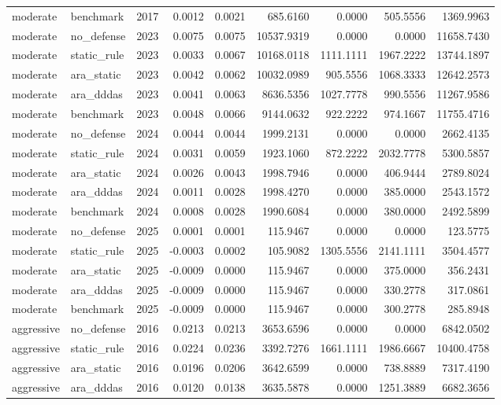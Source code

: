 \begin{tabular}{llrrrrrrr}
moderate & benchmark & 2017 & 0.0012 & 0.0021 & 685.6160 & 0.0000 & 505.5556 & 1369.9963 \\
moderate & no_defense & 2023 & 0.0075 & 0.0075 & 10537.9319 & 0.0000 & 0.0000 & 11658.7430 \\
moderate & static_rule & 2023 & 0.0033 & 0.0067 & 10168.0118 & 1111.1111 & 1967.2222 & 13744.1897 \\
moderate & ara_static & 2023 & 0.0042 & 0.0062 & 10032.0989 & 905.5556 & 1068.3333 & 12642.2573 \\
moderate & ara_dddas & 2023 & 0.0041 & 0.0063 & 8636.5356 & 1027.7778 & 990.5556 & 11267.9586 \\
moderate & benchmark & 2023 & 0.0048 & 0.0066 & 9144.0632 & 922.2222 & 974.1667 & 11755.4716 \\
moderate & no_defense & 2024 & 0.0044 & 0.0044 & 1999.2131 & 0.0000 & 0.0000 & 2662.4135 \\
moderate & static_rule & 2024 & 0.0031 & 0.0059 & 1923.1060 & 872.2222 & 2032.7778 & 5300.5857 \\
moderate & ara_static & 2024 & 0.0026 & 0.0043 & 1998.7946 & 0.0000 & 406.9444 & 2789.8024 \\
moderate & ara_dddas & 2024 & 0.0011 & 0.0028 & 1998.4270 & 0.0000 & 385.0000 & 2543.1572 \\
moderate & benchmark & 2024 & 0.0008 & 0.0028 & 1990.6084 & 0.0000 & 380.0000 & 2492.5899 \\
moderate & no_defense & 2025 & 0.0001 & 0.0001 & 115.9467 & 0.0000 & 0.0000 & 123.5775 \\
moderate & static_rule & 2025 & -0.0003 & 0.0002 & 105.9082 & 1305.5556 & 2141.1111 & 3504.4577 \\
moderate & ara_static & 2025 & -0.0009 & 0.0000 & 115.9467 & 0.0000 & 375.0000 & 356.2431 \\
moderate & ara_dddas & 2025 & -0.0009 & 0.0000 & 115.9467 & 0.0000 & 330.2778 & 317.0861 \\
moderate & benchmark & 2025 & -0.0009 & 0.0000 & 115.9467 & 0.0000 & 300.2778 & 285.8948 \\
aggressive & no_defense & 2016 & 0.0213 & 0.0213 & 3653.6596 & 0.0000 & 0.0000 & 6842.0502 \\
aggressive & static_rule & 2016 & 0.0224 & 0.0236 & 3392.7276 & 1661.1111 & 1986.6667 & 10400.4758 \\
aggressive & ara_static & 2016 & 0.0196 & 0.0206 & 3642.6599 & 0.0000 & 738.8889 & 7317.4190 \\
aggressive & ara_dddas & 2016 & 0.0120 & 0.0138 & 3635.5878 & 0.0000 & 1251.3889 & 6682.3656 \\

\end{tabular}
